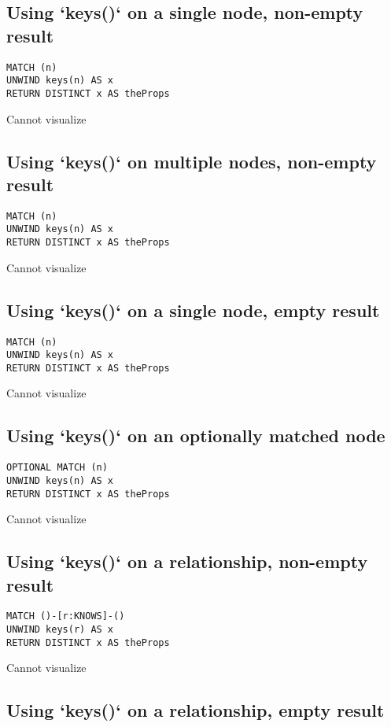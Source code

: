 \subsection{Using `keys()` on a single node, non-empty result}

\begin{lstlisting}
MATCH (n)
UNWIND keys(n) AS x
RETURN DISTINCT x AS theProps
\end{lstlisting}

Cannot visualize
\subsection{Using `keys()` on multiple nodes, non-empty result}

\begin{lstlisting}
MATCH (n)
UNWIND keys(n) AS x
RETURN DISTINCT x AS theProps
\end{lstlisting}

Cannot visualize
\subsection{Using `keys()` on a single node, empty result}

\begin{lstlisting}
MATCH (n)
UNWIND keys(n) AS x
RETURN DISTINCT x AS theProps
\end{lstlisting}

Cannot visualize
\subsection{Using `keys()` on an optionally matched node}

\begin{lstlisting}
OPTIONAL MATCH (n)
UNWIND keys(n) AS x
RETURN DISTINCT x AS theProps
\end{lstlisting}

Cannot visualize
\subsection{Using `keys()` on a relationship, non-empty result}

\begin{lstlisting}
MATCH ()-[r:KNOWS]-()
UNWIND keys(r) AS x
RETURN DISTINCT x AS theProps
\end{lstlisting}

Cannot visualize
\subsection{Using `keys()` on a relationship, empty result}

